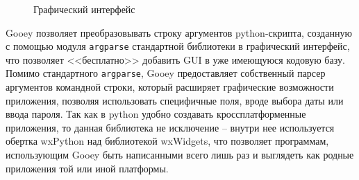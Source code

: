 \begin{figure}[!htbp]
    \caption{Графический интерфейс {\ProgModule}\label{fig:apndv-gooey}}
\end{figure}

Gooey позволяет преобразовывать строку аргументов python-скрипта, созданную с помощью
модуля \verb|argparse| стандартной библиотеки в графический интерфейс, что позволяет
<<бесплатно>> добавить GUI в уже имеющуюся кодовую базу.
Помимо стандартного \verb|argparse|, Gooey предоставляет собственный парсер аргументов
командной строки, который расширяет графические возможности приложения, позволяя
использовать специфичные поля, вроде выбора даты или ввода пароля.
Так как в python удобно создавать кроссплатформенные приложения, то
данная библиотека не исключение -- внутри нее используется
обертка wxPython над библиотекой wxWidgets, что позволяет программам, использующим
Gooey быть написанными всего лишь раз и выглядеть как родные приложения той или иной
платформы.

%        

